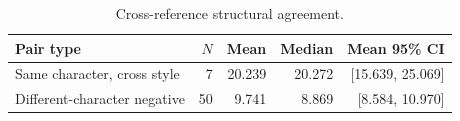 \begin{table}[t]
\caption{Cross-reference structural agreement.}
\label{tab:cross-reference}
\centering
\begin{tabular}{lrrrr}
\toprule
Pair type & $N$ & Mean & Median & Mean 95\% CI \\
\midrule
Same character, cross style & 7 & 20.239 & 20.272 & [15.639, 25.069] \\
Different-character negative & 50 & 9.741 & 8.869 & [8.584, 10.970] \\
\bottomrule
\end{tabular}
\end{table}
